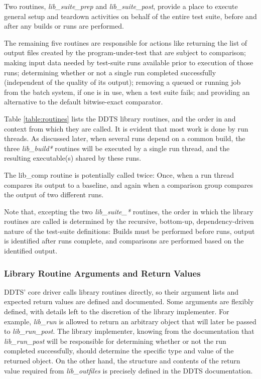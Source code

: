 \documentclass[conference]{IEEEtran}
\begin{document}
Two routines, \emph{lib\_suite\_prep} and \emph{lib\_suite\_post}, provide a place to execute general setup and teardown activities on behalf of the entire test suite, before and after any builds or runs are performed.

The remaining five routines are responsible for actions like returning the list of output files created by the program-under-test that are subject to comparison; making input data needed by test-suite runs available prior to execution of those runs; determining whether or not a single run completed successfully (independent of the quality of its output); removing a queued or running job from the batch system, if one is in use, when a test suite fails; and providing an alternative to the default bitwise-exact comparator.

Table \ref{table:routines} lists the DDTS library routines, and the order in and context from which they are called. It is evident that most work is done by run threads. As discussed later, when several runs depend on a common build, the three \emph{lib\_build*} routines will be executed by a single run thread, and the resulting executable(s) shared by these runs.

The lib\_comp routine is potentially called twice: Once, when a run thread compares its output to a baseline, and again when a comparison group compares the output of two different runs.

Note that, excepting the two \emph{lib\_suite\_*} routines, the order in which the library routines are called is determined by the recursive, bottom-up, dependency-driven nature of the test-suite definitions: Builds must be performed before runs, output is identified after runs complete, and comparisons are performed based on the identified output.

\subsubsection{Library Routine Arguments and Return Values}

DDTS' core driver calls library routines directly, so their argument lists and expected return values are defined and documented. Some arguments are flexibly defined, with details left to the discretion of the library implementer. For example, \emph{lib\_run} is allowed to return an arbitrary object that will later be passed to \emph{lib\_run\_post}. The library implementer, knowing from the documentation that \emph{lib\_run\_post} will be responsible for determining whether or not the run completed successfully, should determine the specific type and value of the returned object. On the other hand, the structure and contents of the return value required from \emph{lib\_outfiles} is precisely defined in the DDTS documentation.
\end{document}
